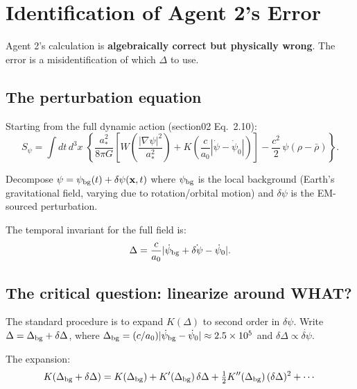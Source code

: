 \documentclass[11pt]{article}
\newcommand{\ee}[1]{\times 10^{#1}}
\newcommand{\half}{\tfrac{1}{2}}
\newcommand{\dpsi}{\delta\psi}
\theoremstyle{definition}
\theoremstyle{remark}
\begin{document}
\section{Identification of Agent 2's Error}
\label{sec:error}

Agent 2's calculation is \textbf{algebraically correct but physically wrong}.
The error is a misidentification of which $\Delta$ to use.

\subsection{The perturbation equation}

Starting from the full dynamic action (section02 Eq.~2.10):
\begin{equation}
S_\psi = \int dt\,d^3x\;\left\{
  \frac{a_*^2}{8\pi G}\left[
    W\!\left(\frac{|\nabla\psi|^2}{a_*^2}\right)
    + K\!\left(\frac{c}{a_0}|\dot\psi{-}\dot\psi_0|\right)
  \right]
  - \frac{c^2}{2}\,\psi(\rho - \bar\rho)
\right\}.
\end{equation}

Decompose $\psi = \psi_{\rm bg}(t) + \dpsi(\mathbf{x},t)$ where $\psi_{\rm bg}$
is the local background (Earth's gravitational field, varying due to
rotation/orbital motion) and $\dpsi$ is the EM-sourced perturbation.

The temporal invariant for the full field is:
\begin{equation}
\Delta = \frac{c}{a_0}|\dot\psi_{\rm bg} + \dot{\dpsi} - \dot\psi_0|.
\end{equation}

\subsection{The critical question: linearize around WHAT?}

The standard procedure is to expand $K(\Delta)$ to second order in $\dpsi$.
Write $\Delta = \Delta_{\rm bg} + \delta\Delta$, where
$\Delta_{\rm bg} = (c/a_0)|\dot\psi_{\rm bg} - \dot\psi_0| \approx 2.5\ee{5}$
and $\delta\Delta \propto \dot{\dpsi}$.

The expansion:
\begin{equation}
K(\Delta_{\rm bg} + \delta\Delta) = K(\Delta_{\rm bg})
+ K'(\Delta_{\rm bg})\,\delta\Delta
+ \half K''(\Delta_{\rm bg})\,(\delta\Delta)^2 + \cdots
\end{equation}
\end{document}
